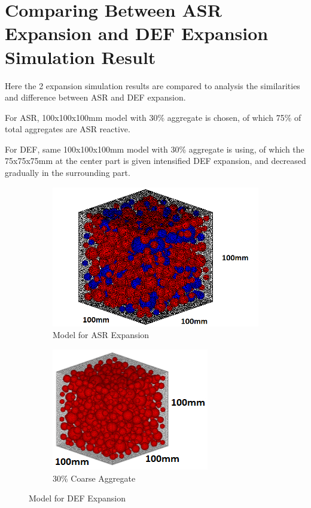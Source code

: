 \clearpage
\section{Comparing Between ASR Expansion and DEF Expansion Simulation Result}


Here the 2 expansion simulation results are compared to analysis the similarities and difference between ASR and DEF expansion.

For ASR, 100x100x100mm model with 30\%  aggregate is chosen, of which 75\% of total aggregates are ASR reactive.

For DEF, same 100x100x100mm model with 30\%  aggregate is using, of which the 75x75x75mm at the center part is given intensified DEF expansion, and decreased gradually in the surrounding part.

\begin{figure}[!h]
\centering
\begin{subfigure}{.5\textwidth}
  \centering
  \includegraphics[width=.8\linewidth]{Files/Aggregate/A30P75.png}
  \caption{Model for ASR Expansion}
  \label{fig:A15_model}
\end{subfigure}%
\begin{subfigure}{.5\textwidth}
  \centering
  \includegraphics[width=.7\linewidth]{Files/Aggregate/A30.png}
  \caption{30\% Coarse Aggregate}
  \label{fig:A15_model}
\end{subfigure}
\caption{Model for DEF Expansion}
\label{fig:Aggregate_Percentage}
\end{figure}


